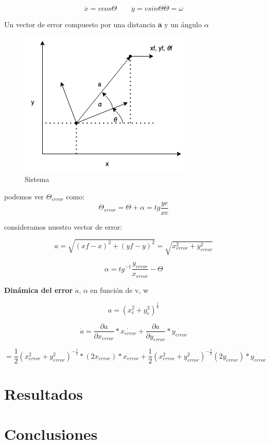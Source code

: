 \documentclass[oneside,onecolumn]{article}
\begin{document}
\[\dot{x} = v cos \Theta \qquad \dot{y} = v sin \Theta \dot{\Theta} = \omega \]

Un vector de error compuesto por una distancia \textbf{a} y un ángulo \textbf{$\alpha$} 

\begin{figure}[h]
  \centering
  \includegraphics[scale=0.7]{graficos/grafico.png}
  \caption{Sistema}
\end{figure}

podemos ver $\Theta_{error}$ como: \\
\[ \Theta_{error} = \Theta + \alpha = tg \frac{ye}{xe} \]

consideramos nuestro vector de error:

\[ a = \sqrt{(xf-x)^{2}+(yf-y)^2} = \sqrt{x_{error}^{2} + y_{error}^2} \]

\[ \alpha = tg^{-1} \frac{y_{error}}{x_{error}} - \Theta\]

\textbf{Dinámica del error} $\dot{a}$, $\dot{\alpha}$ en función de v, w

\[ a = (x_{e}^{2} + y_{e}^{2})^{\frac{1}{2}}\]

\[ \dot{a} = \frac{\partial a}{\partial x_{error}}*\dot{x_{error}} + \frac{\partial a}{\partial y_{error}}*\dot{y_{error}}\]

\[ = \frac{1}{2} (x_{error}^{2} + y_{error}^{2})^{-\frac{1}{2}}*(2x_{error})*\dot{x_{error}} + \frac{1}{2} (x_{error}^{2}+y_{error}^2)^{-\frac{1}{2}}(2y_{error})*\dot{y_{error}}\]

\section{Resultados}


\section{Conclusiones}
\end{document}
